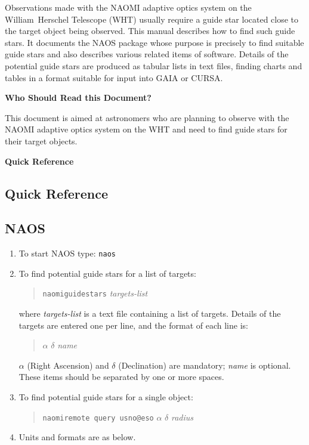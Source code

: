\documentclass[twoside,11pt]{article}
\newcommand{\stardocabstract}
{Observations made with the NAOMI adaptive optics system on the
William~Herschel Telescope (WHT) usually require a guide star located
close to the target object being observed.  This manual describes how to
find such guide stars.  It documents the NAOS package whose purpose is
precisely to find suitable guide stars and also describes various related
items of software.  Details of the potential guide stars are produced as
tabular lists in text files, finding charts and tables in a format
suitable for input into GAIA or CURSA.

\begin{latexonly}
\vspace{5mm}
\end{latexonly}

\begin{center}
{\bf Who Should Read this Document?}
\end{center}

This document is aimed at astronomers who are planning to observe
with the NAOMI adaptive optics system on the WHT and need to find guide
stars for their target objects.}
\newenvironment{latexonly}{}{}
\renewcommand{\_}{\texttt{\symbol{95}}}
\begin{document}
\stardocabstract


\newpage
\begin{latexonly}
\begin{center}
{\Large\bf Quick Reference}
\end{center}
\end{latexonly}

\begin{htmlonly}
\section*{Quick Reference}
\end{htmlonly}

\subsection*{NAOS}

\begin{enumerate}

  \item To start NAOS type: {\tt naos}

  \item To find potential guide stars for a list of targets:

  \begin{quote}
   {\tt naomiguidestars} {\it targets-list}
  \end{quote}

   where {\it targets-list}\/ is a text file containing a list of targets.
   Details of the targets are entered one per line, and the format of each
   line is:

  \begin{quote}
   $\alpha$ $\delta$ {\it name}
  \end{quote}

   $\alpha$\/ (Right Ascension) and $\delta$\/ (Declination) are mandatory;
   {\it name}\/ is optional.  These items should be separated by one or
   more spaces.

  \item To find potential guide stars for a single object:

  \begin{quote}
   {\tt naomiremote query usno@eso} $\alpha$ $\delta$ {\it radius}
  \end{quote}

  \item Units and formats are as below.

\end{enumerate} 
\end{document}
